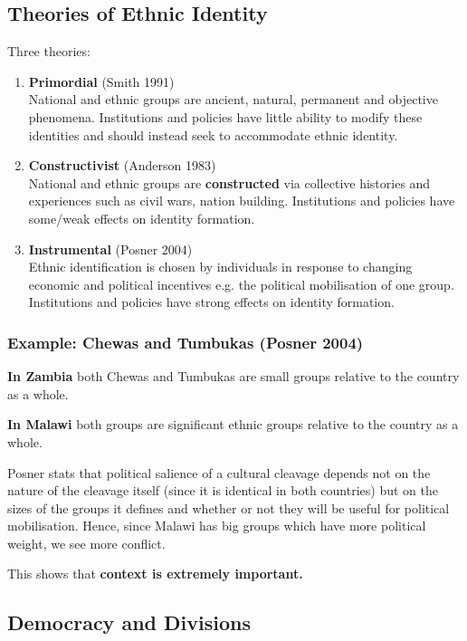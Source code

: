 \documentclass[12pt, letterpaper]{article}
\begin{document}
\subsection{Theories of Ethnic Identity}
Three theories:
\begin{enumerate}
	\item \textbf{Primordial} (Smith 1991)\\
		National and ethnic groups are ancient, natural, permanent and objective phenomena. Institutions and policies have little ability to modify these identities and should instead seek to accommodate ethnic identity.
	\item \textbf{Constructivist} (Anderson 1983)\\
		National and ethnic groups are \textbf{constructed} via collective histories and experiences such as civil wars, nation building. Institutions and policies have some/weak effects on identity formation.
	\item \textbf{Instrumental} (Posner 2004)\\
		Ethnic identification is chosen by individuals in response to changing economic and political incentives e.g. the political mobilisation of one group. Institutions and policies have strong effects on identity formation.
\end{enumerate}

\subsubsection{Example: Chewas and Tumbukas (Posner 2004)}
\textbf{In Zambia} both Chewas and Tumbukas are small groups relative to the country as a whole.

\noindent\textbf{In Malawi} both groups are significant ethnic groups relative to the country as a whole.

Posner stats that political salience of a cultural cleavage depends not on the nature of the cleavage itself (since it is identical in both countries) but on the sizes of the groups it defines and whether or not they will be useful for political mobilisation. Hence, since Malawi has big groups which have more political weight, we see more conflict.

This shows that \textbf{context is extremely important.}

\subsection{Democracy and Divisions}
\end{document}
